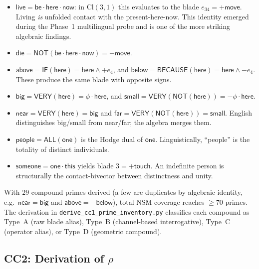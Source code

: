\documentclass[11pt,a4paper]{article}
\theoremstyle{plain}
\theoremstyle{definition}
\theoremstyle{remark}
\numberwithin{equation}{section}
\providecommand{\Cl}{\mathrm{Cl}}
\begin{document}
\begin{itemize}
\item $\mathsf{live} = \mathsf{be} \cdot \mathsf{here} \cdot
      \mathsf{now}$: in $\Cl(3,1)$ this evaluates to the blade
      $e_{34} = +\mathsf{move}$.  Living \emph{is} unfolded contact
      with the present-here-now.  This identity emerged during the
      Phase~1 multilingual probe and is one of the more striking
      algebraic findings.
\item $\mathsf{die} = \mathsf{NOT}(\mathsf{be} \cdot \mathsf{here}
      \cdot \mathsf{now}) = -\mathsf{move}$.
\item $\mathsf{above} = \mathsf{IF}(\mathsf{here}) = \mathsf{here}
      \wedge +e_4$, and $\mathsf{below} = \mathsf{BECAUSE}(\mathsf{here})
      = \mathsf{here} \wedge -e_4$.  These produce the same blade
      with opposite signs.
\item $\mathsf{big} = \mathsf{VERY}(\mathsf{here}) = \phi \cdot
      \mathsf{here}$, and $\mathsf{small} = \mathsf{VERY}
      (\mathsf{NOT}(\mathsf{here})) = -\phi \cdot \mathsf{here}$.
\item $\mathsf{near} = \mathsf{VERY}(\mathsf{here}) = \mathsf{big}$
      and $\mathsf{far} = \mathsf{VERY}(\mathsf{NOT}(\mathsf{here}))
      = \mathsf{small}$.  English distinguishes \textsf{big/small}
      from \textsf{near/far}; the algebra merges them.
\item $\mathsf{people} = \mathsf{ALL}(\mathsf{one})$ is the Hodge
      dual of $\mathsf{one}$.  Linguistically, ``people'' is the
      totality of distinct individuals.
\item $\mathsf{someone} = \mathsf{one} \cdot \mathsf{this}$ yields
      blade $3 = +\mathsf{touch}$.  An indefinite person is
      structurally the contact-bivector between distinctness and
      unity.
\end{itemize}

With $29$ compound primes derived (a few are duplicates by
algebraic identity, e.g.\ $\mathsf{near} = \mathsf{big}$ and
$\mathsf{above} = -\mathsf{below}$), total NSM coverage reaches
$\geq 70$ primes.  The derivation in
\texttt{derive\_cc1\_prime\_inventory.py} classifies each compound
as Type~A (raw blade alias), Type~B (channel-based interrogative),
Type~C (operator alias), or Type~D (geometric compound).

\subsection{CC2: Derivation of $\rho$}\label{sec:cc2}
\end{document}
